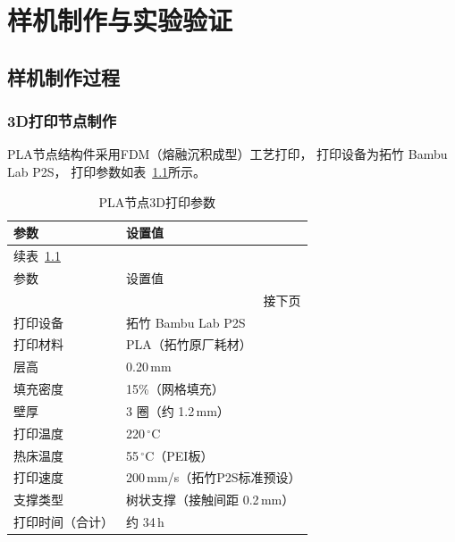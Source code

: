 
\chapter{样机制作与实验验证}

\section{样机制作过程}

\subsection{3D打印节点制作}

PLA节点结构件采用FDM（熔融沉积成型）工艺打印，
打印设备为拓竹 Bambu Lab P2S，
打印参数如表~\ref{tab:print_params}所示。

\begin{longtable}{ll}
    \caption{PLA节点3D打印参数}
    \label{tab:print_params} \\

    \toprule
    参数 & 设置值 \\
    \midrule
    \endfirsthead

    \multicolumn{2}{l}{\small 续表~\ref*{tab:print_params}} \\[2pt]
    \toprule
    参数 & 设置值 \\
    \midrule
    \endhead

    \midrule
    \multicolumn{2}{r}{\small 接下页} \\
    \endfoot

    \bottomrule
    \endlastfoot

    打印设备        & 拓竹 Bambu Lab P2S \\[3pt]
    打印材料        & PLA（拓竹原厂耗材） \\[3pt]
    层高            & 0.20\,mm \\[3pt]
    填充密度        & 15\%（网格填充） \\[3pt]
    壁厚            & 3 圈（约 1.2\,mm） \\[3pt]
    打印温度        & 220\,$^\circ$C \\[3pt]
    热床温度        & 55\,$^\circ$C（PEI板） \\[3pt]
    打印速度        & 200\,mm/s（拓竹P2S标准预设） \\[3pt]
    支撑类型        & 树状支撑（接触间距 0.2\,mm） \\[3pt]
    打印时间（合计）& 约 34\,h \\

\end{longtable}


